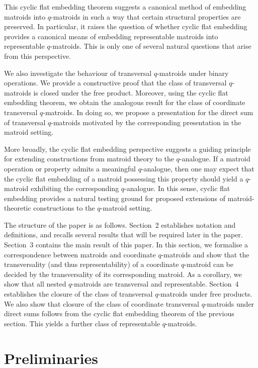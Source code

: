\documentclass{article}
\theoremstyle{definition}
\begin{document}
This cyclic flat embedding theorem suggests a canonical method of embedding matroids into $q$-matroids in such a way that certain structural properties are preserved. In particular, it raises the question of whether cyclic flat embedding provides a canonical means of embedding representable matroids into representable $q$-matroids. This is only one of several natural questions that arise from this perspective.

We also investigate the behaviour of transversal $q$-matroids under binary operations. We provide a constructive proof that the class of transversal $q$-matroids is closed under the free product. Moreover, using the cyclic flat embedding theorem, we obtain the analogous result for the class of coordinate transversal $q$-matroids. In doing so, we propose a presentation for the direct sum of transversal $q$-matroids motivated by the corresponding presentation in the matroid setting.

More broadly, the cyclic flat embedding perspective suggests a guiding principle for extending constructions from matroid theory to the $q$-analogue. If a matroid operation or property admits a meaningful $q$-analogue, then one may expect that the cyclic flat embedding of a matroid possessing this property should yield a $q$-matroid exhibiting the corresponding $q$-analogue. In this sense, cyclic flat embedding provides a natural testing ground for proposed extensions of matroid-theoretic constructions to the $q$-matroid setting.

The structure of the paper is as follows. Section~2 establishes notation and definitions, and recalls several results that will be required later in the paper. Section~3 contains the main result of this paper. In this section, we formalise a correspondence between matroids and coordinate $q$-matroids and show that the transversality (and thus representability) of a coordinate $q$-matroid can be decided by the transversality of its corresponding matroid. As a corollary, we show that all nested $q$-matroids are transversal and representable. 
Section~4 establishes the closure of the class of transversal $q$-matroids under free products. We also show that closure of the class of coordinate transversal $q$-matroids under direct sums follows from the cyclic flat embedding theorem of the previous section. This yields a further class of representable $q$-matroids.

\section{Preliminaries}
\end{document}
